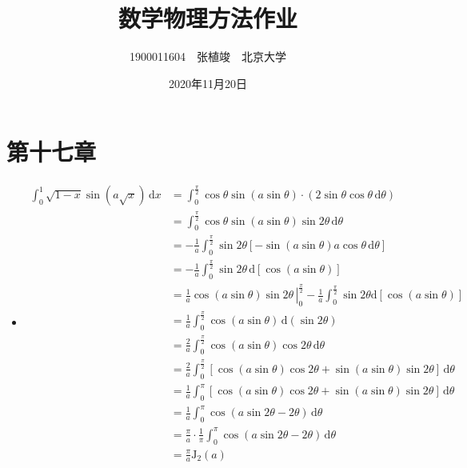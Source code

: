 \documentclass[fontset=windows]{ctexart}
\begin{document}
    \title{\textbf{数学物理方法作业}}
    \author{1900011604\ \ 张植竣\ \ 北京大学}
    \date{2020年11月20日}

    \maketitle

    \section*{第十七章}
    \bigskip

    \begin{itemize}

    \item[1.(1)]
    \begin{align*}
    \int_0^1\sqrt{1-x}\sin(a\sqrt{x})\,\mathrm{d}x
    &= \int_0^{\tfrac{\pi}{2}}\cos\theta\sin(a\sin\theta)\cdot(2\sin\theta\cos\theta\,\mathrm{d}\theta) \\
    &= \int_0^{\tfrac{\pi}{2}}\cos\theta\sin(a\sin\theta)\sin2\theta\,\mathrm{d}\theta \\
    &= -\frac{1}{a}\int_0^{\tfrac{\pi}{2}}\sin2\theta\left[-\sin(a\sin\theta)a\cos\theta \,\mathrm{d}\theta \right] \\
    &= -\frac{1}{a}\int_0^{\tfrac{\pi}{2}}\sin2\theta\,\mathrm{d}\left[\cos(a\sin\theta)\right] \\
    &= \left.\frac{1}{a}\cos(a\sin\theta)\sin2\theta\,\right|_0^\tfrac{\pi}{2} - \frac{1}{a}\int_0^{\tfrac{\pi}{2}}\sin2\theta\mathrm{d}\left[\cos(a\sin\theta)\right] \\
    &= \frac{1}{a}\int_0^{\tfrac{\pi}{2}}\cos(a\sin\theta)\,\mathrm{d}(\sin2\theta) \\
    &= \frac{2}{a}\int_0^{\tfrac{\pi}{2}}\cos(a\sin\theta)\cos2\theta\,\mathrm{d}\theta \\
    &= \frac{2}{a}\int_0^{\tfrac{\pi}{2}}\left[\cos(a\sin\theta)\cos2\theta + \sin(a\sin\theta)\sin2\theta\right]\,\mathrm{d}\theta \\
    &= \frac{1}{a}\int_0^{\pi}\left[\cos(a\sin\theta)\cos2\theta + \sin(a\sin\theta)\sin2\theta\right]\,\mathrm{d}\theta \\
    &= \frac{1}{a}\int_0^{\pi}\cos(a\sin2\theta-2\theta)\,\mathrm{d}\theta \\
    &= \frac{\pi}{a}\cdot\frac{1}{\pi}\int_0^{\pi}\cos(a\sin2\theta-2\theta)\,\mathrm{d}\theta \\
    &= \frac{\pi}{a}\mathrm{J}_2(a)
    \end{align*}
    \medskip


\end{itemize}
\end{document}
